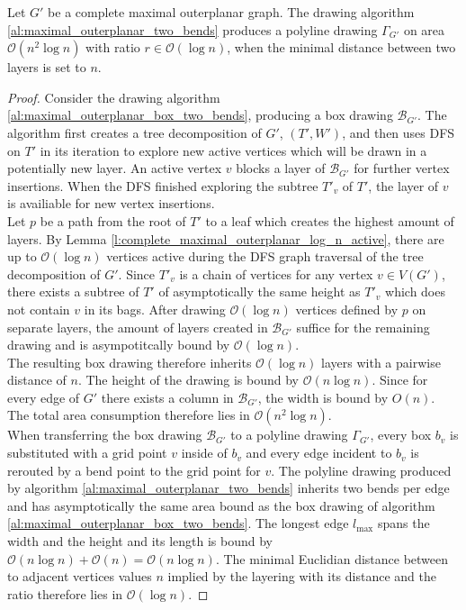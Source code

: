 \begin{theorem}
	Let $G'$ be a complete maximal outerplanar graph. The drawing algorithm \ref{al:maximal_outerplanar_two_bends} produces a polyline drawing $\Gamma_{G'}$ on area $\mathcal{O}(n^2 \log n)$ with ratio $r \in \mathcal{O}(\log n)$, when the minimal distance between two layers is set to $n$.\label{th:complete_maximal_outerplanar_ratio_logn}
\end{theorem}
\begin{proof}
	Consider the drawing algorithm \ref{al:maximal_outerplanar_box_two_bends}, producing a box drawing $\mathcal{B}_{G'}$. The algorithm first creates a tree decomposition of $G'$, $(T',W')$, and then uses DFS on $T'$ in its iteration to explore new active vertices which will be drawn in a potentially new layer. An active vertex $v$ blocks a layer of $\mathcal{B}_{G'}$ for further vertex insertions. When the DFS finished exploring the subtree $T'_{v}$ of $T'$, the layer of $v$ is availiable for new vertex insertions.\\
	Let $p$ be a path from the root of $T'$ to a leaf which creates the highest amount of layers. By Lemma \ref{l:complete_maximal_outerplanar_log_n_active}, there are up to $\mathcal{O}(\log n)$ vertices active during the DFS graph traversal of the tree decomposition of $G'$. Since $T'_{v}$ is a chain of vertices for any vertex $v\in V(G')$, there exists a subtree of $T'$ of asymptotically the same height as $T'_{v}$ which does not contain $v$ in its bags. After drawing $\mathcal{O}(\log n)$ vertices defined by $p$ on separate layers, the amount of layers created in $\mathcal{B}_{G'}$ suffice for the remaining drawing and is asympotitcally bound by $\mathcal{O}(\log n)$.\\
	The resulting box drawing therefore inherits $\mathcal{O}(\log n)$ layers with a pairwise distance of $n$. The height of the drawing is bound by $\mathcal{O}(n \log n)$. Since for every edge of $G'$ there exists a column in $\mathcal{B}_{G'}$, the width is bound by $O(n)$. The total area consumption therefore lies in $\mathcal{O}(n^2 \log n)$.\\
	When transferring the box drawing $\mathcal{B}_{G'}$ to a polyline drawing $\Gamma_{G'}$, every box $b_v$ is substituted with a grid point $v$ inside of $b_v$ and every edge incident to $b_v$ is rerouted by a bend point to the grid point for $v$. The polyline drawing produced by algorithm \ref{al:maximal_outerplanar_two_bends} inherits two bends per edge and has asymptotically the same area bound as the box drawing of algorithm \ref{al:maximal_outerplanar_box_two_bends}. The longest edge $l_{\max}$ spans the width and the height and its length is bound by $\mathcal{O}(n \log n) + \mathcal{O}(n) = \mathcal{O}(n \log n)$. The minimal Euclidian distance between to adjacent vertices values $n$ implied by the layering with its distance and the ratio therefore lies in $\mathcal{O}(\log n)$.
\end{proof}


